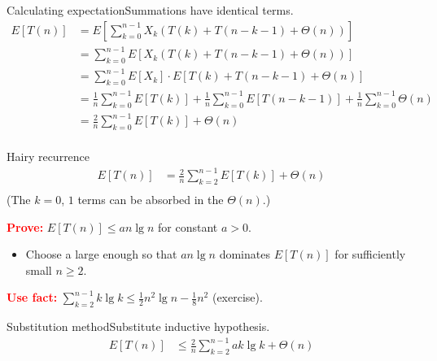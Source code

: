 \documentclass{beamer}
\begin{document}
\begin{frame}{Calculating expectation}{Summations have identical terms.}
    \begin{equation*}
        \begin{split}
E[T(n)] &= E\left[ \sum\limits_{k=0}^{n-1} X_k(T(k) + T(n - k - 1) + \Theta(n)) \right] \\
        &= \sum\limits_{k=0}^{n-1} E\left[ X_k(T(k) + T(n - k - 1) + \Theta(n)) \right] \\
        &= \sum\limits_{k=0}^{n-1} E[X_k] \cdot E[T(k) + T(n - k - 1) + \Theta(n)] \\
        &= \frac{1}{n}\sum\limits_{k=0}^{n-1} E[T(k)] +
           \frac{1}{n}\sum\limits_{k=0}^{n-1} E[T(n - k - 1)] +
           \frac{1}{n}\sum\limits_{k=0}^{n-1} \Theta(n) \\
        &= \frac{2}{n}\sum\limits_{k=0}^{n-1} E[T(k)] + \Theta(n) \\
        \end{split}
    \end{equation*}
\end{frame}

\begin{frame}{Hairy recurrence}
    \begin{equation*}
        \begin{split}
        E[T(n)] &= \frac{2}{n}\sum\limits_{k=2}^{n-1} E[T(k)] + \Theta(n) \\
        \end{split}
    \end{equation*}
    (The $k = 0$, $1$ terms can be absorbed in the $\Theta(n)$.)
    \begin{alertblock}{\textcolor{red}{\textbf{Prove:}}}
        $E[T(n)] \leq a n \lg n$ for constant $a > 0$.
    \end{alertblock}
    \begin{itemize}
        \item Choose a large enough so that $a n \lg n$ dominates $E[T(n)]$ for sufficiently small $n \geq 2$.
    \end{itemize}
    \begin{alertblock}{\textcolor{red}{\textbf{Use fact:}}}
        $\sum\limits_{k=2}^{n-1} k \lg k \leq \frac{1}{2} n^2 \lg n - \frac{1}{8} n^2$ (exercise).
    \end{alertblock}
\end{frame}

\begin{frame}{Substitution method}{Substitute inductive hypothesis.}
    \begin{equation*}
        \begin{split}
        E[T(n)] &\leq \frac{2}{n}\sum\limits_{k=2}^{n-1} a k \lg k + \Theta(n) \\
        \end{split}
    \end{equation*}
\end{frame}
\end{document}
